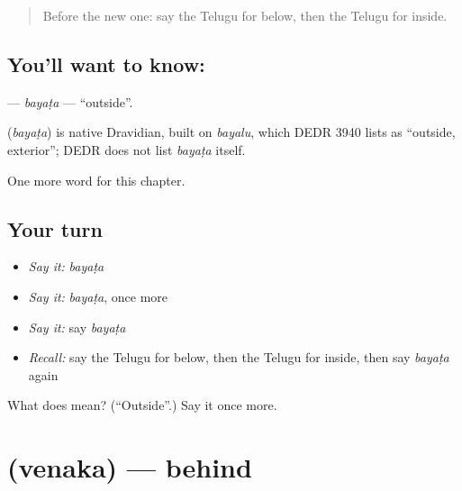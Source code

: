 \label{lesson:TE-C101-bayata}



\begin{quote}
Before the new one: say the Telugu for below, then the Telugu for inside.
\end{quote}

\subsection*{You'll want to know: }
\textbf{} — \emph{bayaṭa} — \textquotedblleft{}outside\textquotedblright{}.

\begin{cousinweb}
\textbf{} (\emph{bayaṭa}) is native Dravidian, built on \emph{bayalu}, which DEDR 3940 lists as \textquotedblleft{}outside, exterior\textquotedblright{}; DEDR does not list \emph{bayaṭa} itself.
\end{cousinweb}

\begin{grammarlens}[title={What you've built}]
One more word for this chapter.
\end{grammarlens}

\subsection*{Your turn}
\begin{itemize}
\raggedright
  \item \emph{Say it:} \emph{bayaṭa}
  \item \emph{Say it:} \emph{bayaṭa}, once more
  \item \emph{Say it:} say \emph{bayaṭa}
  \item \emph{Recall:} say the Telugu for below, then the Telugu for inside, then say \emph{bayaṭa} again
\end{itemize}

\begin{tcolorbox}[breakable,colback=teal!4,colframe=teal!35!black,title={Before you move on}]
What does  mean? (\textquotedblleft{}Outside\textquotedblright{}.) Say it once more.
\end{tcolorbox}
\section[\texorpdfstring{\te{వెనక} (venaka)}{వెనక (venaka)}]{ (venaka) — behind}

\label{lesson:TE-C101-venaka}



